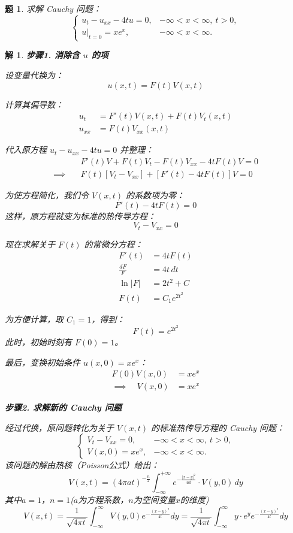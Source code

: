 \documentclass[12pt,a4paper]{article}
\newtheorem{problem}{题}
\newtheorem*{solution}{解}
\begin{document}
	\newpage
	\begin{problem}
		求解 Cauchy 问题：
		\[
		\begin{cases}
			u_t - u_{xx} - 4tu = 0, & -\infty < x < \infty, \ t > 0, \\[6pt]
			u|_{t=0} = xe^x, & -\infty < x < \infty.
		\end{cases}
		\]
	\end{problem}
		\hrulefill
	\begin{solution}
		\textbf{步骤1. 消除含 $u$ 的项}
		
		\noindent
设变量代换为：
\[
u(x,t) = F(t) V(x,t)
\]

计算其偏导数：
\begin{align*}
	u_t &= F'(t) V(x,t) + F(t) V_t(x,t) \\[6pt]
	u_{xx} &= F(t) V_{xx}(x,t)
\end{align*}

代入原方程 $u_t - u_{xx} - 4tu = 0$ 并整理：
\begin{align*}
	& F'(t)V + F(t)V_t - F(t)V_{xx} - 4t F(t)V = 0 \\[6pt]
	\implies \quad & F(t) \left[ V_t - V_{xx} \right] + \left[ F'(t) - 4t F(t) \right] V = 0
\end{align*}

为使方程简化，我们令 $V(x,t)$ 的系数项为零：
\[
F'(t) - 4t F(t) = 0
\]
这样，原方程就变为标准的热传导方程：
\[
V_t - V_{xx} = 0
\]

现在求解关于 $F(t)$ 的常微分方程：
\begin{align*}
	F'(t) &= 4t F(t) \\[6pt]
	\frac{dF}{F} &= 4t \, dt \\[6pt]
	\ln|F| &= 2t^2 + C \\[6pt]
	F(t) &= C_1 e^{2t^2}
\end{align*}

为方便计算，取 $C_1=1$，得到：
\[
F(t) = e^{2t^2}
\]
此时，初始时刻有 $F(0)=1$。

最后，变换初始条件 $u(x,0)=xe^x$：
\begin{align*}
	F(0) V(x,0) &= xe^x \\
	\implies \quad V(x,0) &= xe^x
\end{align*}

		\hrulefill
		
		\textbf{步骤2. 求解新的 Cauchy 问题}
		
		\noindent
		经过代换，原问题转化为关于 $V(x,t)$ 的标准热传导方程的 Cauchy 问题：
		\[
		\begin{cases}
			V_t - V_{xx} = 0, & -\infty < x < \infty, \ t > 0, \\[6pt]
			V(x,0) = xe^x, & -\infty < x < \infty.
		\end{cases}
		\]
		该问题的解由热核（Poisson公式）给出：
			\[
		V(x,t)= (4 \pi a t)^{-\frac{n}{2}} \int_{-\infty}^{+\infty} e^{-\frac{|x-y|^2}{4at}} \cdot V(y,0) \, dy
		\]
		其中$a=1$，$n=1$($a$为方程系数，$n$为空间变量$x$的维度)
		\[
		V(x,t) = \frac{1}{\sqrt{4\pi t}} \int_{-\infty}^{\infty} V(y,0) e^{-\frac{(x-y)^2}{4t}} dy = \frac{1}{\sqrt{4\pi t}} \int_{-\infty}^{\infty} y\cdot e^y e^{-\frac{(x-y)^2}{4t}} dy
		\]
		

\end{solution}
\end{document}
